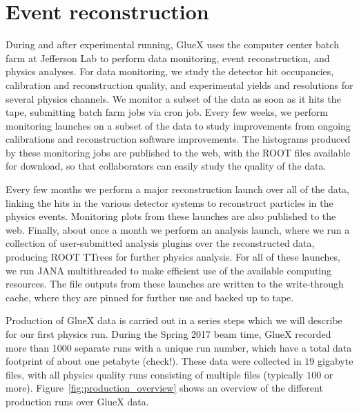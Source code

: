 

\section[Event reconstruction (Alex A.)]{Event reconstruction \label{sec:reconstruction}}


During and after experimental running, GlueX uses the computer center batch farm at Jefferson Lab to perform data monitoring, event reconstruction, and physics analyses.  For data monitoring, we study the detector hit occupancies, calibration and reconstruction quality, and experimental yields and resolutions for several physics channels.  We monitor a subset of the data as soon as it hits the tape, submitting batch farm jobs via cron job.  Every few weeks, we perform monitoring launches on a subset of the data to study improvements from ongoing calibrations and reconstruction software improvements.  The histograms produced by these monitoring jobs are published to the web, with the ROOT files available for download, so that collaborators can easily study the quality of the data. 

Every few months we perform a major reconstruction launch over all of the data, linking the hits in the various detector systems to reconstruct particles in the physics events.  Monitoring plots from these launches are also published to the web. Finally, about once a month we perform an analysis launch, where we run a collection of user-submitted analysis plugins over the reconstructed data, producing ROOT TTrees for further physics analysis. For all of these launches, we run JANA multithreaded to make efficient use of the available computing resources. %
The file outputs from these launches are written to the write-through cache, where they are pinned for further use and backed up to tape.  

Production of GlueX data is carried out in a series steps which we will describe for our first physics run. During the Spring 2017 beam time, GlueX recorded more than 1000 separate runs with a unique run number, which have a total data footprint of about one petabyte (check!). These data were collected in $19$ gigabyte files, with all physics quality runs consisting of multiple files (typically $100$ or more). Figure~\ref{fig:production_overview} shows an overview of the different production runs over GlueX data. 

